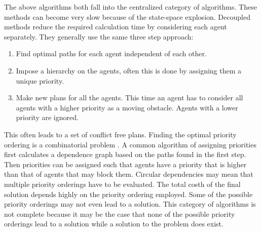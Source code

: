 
The above algorithms both fall into the centralized category of algorithms.
These methods can become very slow because of the state-space explosion.
Decoupled methods reduce the required calculation time by considering each
agent separately. They generally use the same three step approach:
\begin{enumerate}
    \item Find optimal paths for each agent independent of each other.
    \item Impose a hierarchy on the agents, often this is done by assigning
    them a unique priority.
    \item Make new plans for all the agents. This time an agent has to consider
    all agents with a higher priority as a moving obstacle. Agents with a lower
    priority are ignored.
\end{enumerate}
This often leads to a set of conflict free plans. Finding the optimal priority
ordering is a combinatorial problem \cite{bennewitz2002}. A common algorithm of
assigning priorities first calculates a dependence graph based on the paths
found in the first step. Then priorities can be assigned such that agents have
a priority that is higher than that of agents that may block them. Circular
dependencies may mean that multiple priority orderings have to be evaluated. The
total costh of the final solution depends highly on the priority ordering
employed.
Some of the possible priority orderings may not even lead to a solution. This
category of algorithms is not complete because it may be the case that none of
the possible priority orderings lead to a solution while a solution to the
problem does exist.

